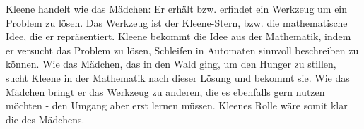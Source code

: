 \documentclass{article}
\begin{document}
Kleene handelt wie das Mädchen: Er erhält bzw. erfindet ein Werkzeug um ein Problem zu lösen. Das Werkzeug ist der Kleene-Stern, bzw. die mathematische Idee, die er repräsentiert. Kleene bekommt die Idee aus der Mathematik, indem er versucht das Problem zu lösen, Schleifen in Automaten sinnvoll beschreiben zu können. Wie das Mädchen, das in den Wald ging, um den Hunger zu stillen, sucht Kleene in der Mathematik nach dieser Lösung und bekommt sie. Wie das Mädchen bringt er das Werkzeug zu anderen, die es ebenfalls gern nutzen möchten - den Umgang aber erst lernen müssen. Kleenes Rolle wäre somit klar die des Mädchens.
\end{document}
